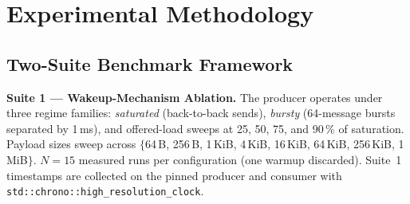 \documentclass[10pt,conference]{IEEEtran}
\begin{document}
\begin{table}[!t]
  \centering
\caption{Suite 1 Wakeup Mechanism Properties Summary}
  \label{tab:wakeup}
  \small
\end{table}

\section{Experimental Methodology}

\subsection{Two-Suite Benchmark Framework}

\textbf{Suite 1 --- Wakeup-Mechanism Ablation.}
The producer operates under three regime families: \emph{saturated}
(back-to-back sends), \emph{bursty} (64-message bursts separated by 1\,ms),
and offered-load sweeps at 25, 50, 75, and 90\,\% of saturation.  Payload sizes
sweep across $\{$64\,B, 256\,B, 1\,KiB, 4\,KiB, 16\,KiB, 64\,KiB,
256\,KiB, 1\,MiB$\}$.
$N=15$ measured runs per configuration (one warmup discarded).
Suite~1 timestamps are collected on the pinned producer and consumer with
\texttt{std::chrono::high\_resolution\_clock}.
\end{document}

